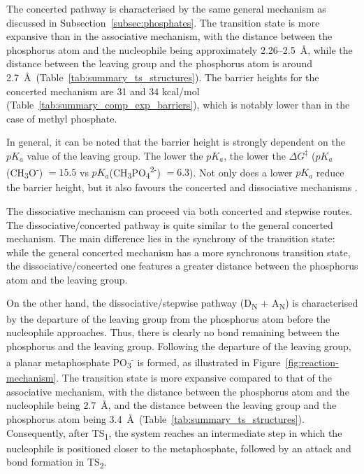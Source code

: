 The concerted pathway is characterised by the same general mechanism as discussed in Subsection~\ref{subsec:phosphates}. The transition state is more expansive than in the associative mechanism, with the distance between the phosphorus atom and the nucleophile being approximately 2.26--2.5~\AA, while the distance between the leaving group and the phosphorus atom is around 2.7~\AA\ (Table~\ref{tab:summary_ts_structures}). The barrier heights for the concerted mechanism are 31 and 34 kcal/mol (Table~\ref{tab:summary_comp_exp_barriers}), which is notably lower than in the case of methyl phosphate.

In general, it can be noted that the barrier height is strongly dependent on the $pK_a$ value of the leaving group. The lower the $pK_a$, the lower the $\Delta G^{\ddagger}$ ($pK_a$(CH\textsubscript{3}O\textsuperscript{-}) $= 15.5$ vs $pK_a$(CH\textsubscript{3}PO\textsubscript{4}\textsuperscript{2-}) $= 6.3$). Not only does a lower $pK_a$ reduce the barrier height, but it also favours the concerted and dissociative mechanisms \citep{klahnMechanismHydrolysisPhosphate2006}.

The dissociative mechanism can proceed via both concerted and stepwise routes. The dissociative/concerted pathway is quite similar to the general concerted mechanism. The main difference lies in the synchrony of the transition state: while the general concerted mechanism has a more synchronous transition state, the dissociative/concerted one features a greater distance between the phosphorus atom and the leaving group.

On the other hand, the dissociative/stepwise pathway (D\textsubscript{N} + A\textsubscript{N}) is characterised by the departure of the leaving group from the phosphorus atom before the nucleophile approaches. Thus, there is clearly no bond remaining between the phosphorus and the leaving group. Following the departure of the leaving group, a planar metaphosphate PO\textsubscript{3}\textsuperscript{-} is formed, as illustrated in Figure~\ref{fig:reaction-mechanism}. The transition state is more expansive compared to that of the associative mechanism, with the distance between the phosphorus atom and the nucleophile being 2.7~\AA, and the distance between the leaving group and the phosphorus atom being 3.4~\AA\ (Table~\ref{tab:summary_ts_structures}). Consequently, after TS\textsubscript{1}, the system reaches an intermediate step in which the nucleophile is positioned closer to the metaphosphate, followed by an attack and bond formation in TS\textsubscript{2}.

